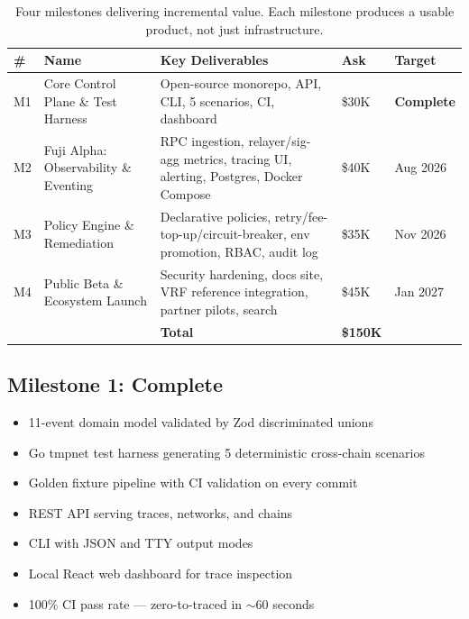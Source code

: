 \documentclass[11pt,a4paper]{article}
\begin{document}
\begin{table}[h]
\centering
\small
\begin{tabularx}{\textwidth}{@{}C{0.6cm} L{4cm} L{5.5cm} C{1.2cm} C{1.8cm}@{}}
\toprule
\textbf{\#} & \textbf{Name} & \textbf{Key Deliverables} & \textbf{Ask} & \textbf{Target} \\
\midrule
{}
M1 & Core Control Plane \& Test Harness & Open-source monorepo, API, CLI, 5 scenarios, CI, dashboard & \$30K & \textcolor{successgreen}{\textbf{Complete}} \\
\addlinespace
M2 & Fuji Alpha: Observability \& Eventing & RPC ingestion, relayer/sig-agg metrics, tracing UI, alerting, Postgres, Docker Compose & \$40K & Aug 2026 \\
\addlinespace
M3 & Policy Engine \& Remediation & Declarative policies, retry/fee-top-up/circuit-breaker, env promotion, RBAC, audit log & \$35K & Nov 2026 \\
\addlinespace
M4 & Public Beta \& Ecosystem Launch & Security hardening, docs site, VRF reference integration, partner pilots, search & \$45K & Jan 2027 \\
\midrule
& & \textbf{Total} & \textbf{\$150K} & \\
\bottomrule
\end{tabularx}
\caption{Four milestones delivering incremental value. Each milestone produces a usable product, not just infrastructure.}
\end{table}

\subsection{Milestone 1: Complete}

\begin{metricbox}
\begin{itemize}[nosep]
  \item 11-event domain model validated by Zod discriminated unions
  \item Go tmpnet test harness generating 5 deterministic cross-chain scenarios
  \item Golden fixture pipeline with CI validation on every commit
  \item REST API serving traces, networks, and chains
  \item CLI with JSON and TTY output modes
  \item Local React web dashboard for trace inspection
  \item 100\% CI pass rate --- zero-to-traced in $\sim$60 seconds
\end{itemize}
\end{metricbox}
\end{document}
